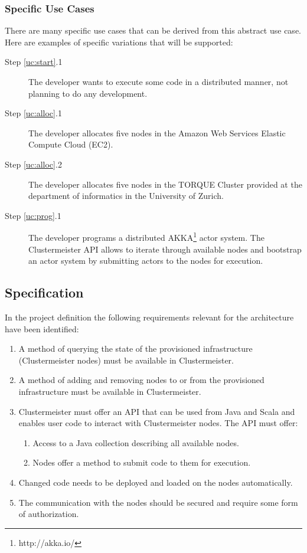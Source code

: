 \documentclass[english]{uzhpub}
\begin{document}
\subsubsection*{Specific Use Cases}
There are many specific use cases that can be derived from this abstract use case. Here are examples of specific variations that will be supported:

\begin{description}
\item[Step \ref{uc:start}.1] The developer wants to execute some code in a distributed manner, not planning to do any development.
\item[Step \ref{uc:alloc}.1] The developer allocates five nodes in the Amazon Web Services Elastic Compute Cloud (EC2).
\item[Step \ref{uc:alloc}.2] The developer allocates five nodes in the TORQUE Cluster provided at the department of informatics in the University of Zurich.
\item[Step \ref{uc:prog}.1] The developer programs a distributed AKKA\footnote{http://akka.io/} actor system. The Clustermeister API allows to iterate through available nodes and bootstrap an actor system by submitting actors to the nodes for execution.
\end{description}

\subsection{Specification}
\label{spec}
In the project definition the following requirements relevant for the architecture have been identified:

\begin{enumerate}
\item A method of querying the state of the provisioned infrastructure (Clustermeister nodes) must be available in Clustermeister.
\item A method of adding and removing nodes to or from the provisioned infrastructure must be available in Clustermeister.
\item Clustermeister must offer an API that can be used from Java and Scala and enables user code to interact with Clustermeister nodes. The API must offer:
\begin{enumerate}
\item Access to a Java collection describing all available nodes.
\item Nodes offer a method to submit code to them for execution.
\end{enumerate}
\item Changed code needs to be deployed and loaded on the nodes automatically.
\item The communication with the nodes should be secured and require some form of authorization. 
\end{enumerate}
\end{document}
